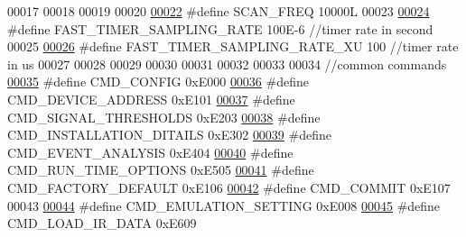 \begin{DoxyCode}
00017 
00018 
00019 
00020 
\hypertarget{a00031_source_l00022}{}\hyperlink{a00031_a8127170b687c1f67a968886c128e76e4}{00022} \textcolor{preprocessor}{#define SCAN\_FREQ                                       10000L}
00023 
\hypertarget{a00031_source_l00024}{}\hyperlink{a00031_a3a4dcb8af26a561d90607a41a3745806}{00024} \textcolor{preprocessor}{#define FAST\_TIMER\_SAMPLING\_RATE                        100E-6        //timer rate in second}
00025 
\hypertarget{a00031_source_l00026}{}\hyperlink{a00031_a87ea9a0eaa474d8b8f672cfa5cbb091f}{00026} \textcolor{preprocessor}{#define FAST\_TIMER\_SAMPLING\_RATE\_XU                     100           //timer rate in us}
00027 
00028 
00029 
00030 
00031 
00032 
00033 
00034 \textcolor{comment}{//common commands}
\hypertarget{a00031_source_l00035}{}\hyperlink{a00031_aa87bfa4fccf7f7a4fc45afb1966a655f}{00035} \textcolor{preprocessor}{#define CMD\_CONFIG                                              0xE000}
\hypertarget{a00031_source_l00036}{}\hyperlink{a00031_a7c6a5f4023cb02d02f2ded23147be425}{00036} \textcolor{preprocessor}{#define CMD\_DEVICE\_ADDRESS                                      0xE101}
\hypertarget{a00031_source_l00037}{}\hyperlink{a00031_ac361dc1b32c1036394be0fd7de1182ca}{00037} \textcolor{preprocessor}{#define CMD\_SIGNAL\_THRESHOLDS                                   0xE203}
\hypertarget{a00031_source_l00038}{}\hyperlink{a00031_af91ff280feea1f52e3bdd7f0f556d153}{00038} \textcolor{preprocessor}{#define CMD\_INSTALLATION\_DITAILS                                0xE302}
\hypertarget{a00031_source_l00039}{}\hyperlink{a00031_a3a15793e3ab7817f2429edf04de693a0}{00039} \textcolor{preprocessor}{#define CMD\_EVENT\_ANALYSIS                                      0xE404}
\hypertarget{a00031_source_l00040}{}\hyperlink{a00031_a1d8673a7ca545f3e382fc538f543ab72}{00040} \textcolor{preprocessor}{#define CMD\_RUN\_TIME\_OPTIONS                                    0xE505}
\hypertarget{a00031_source_l00041}{}\hyperlink{a00031_a8ad7dae51114833acbb665d703d8ffeb}{00041} \textcolor{preprocessor}{#define CMD\_FACTORY\_DEFAULT                                     0xE106}
\hypertarget{a00031_source_l00042}{}\hyperlink{a00031_a7df85bf97a6a032220d7a71c78be5206}{00042} \textcolor{preprocessor}{#define CMD\_COMMIT                                              0xE107}
00043 
\hypertarget{a00031_source_l00044}{}\hyperlink{a00031_a230386ac00f9c01793857101e1680324}{00044} \textcolor{preprocessor}{#define CMD\_EMULATION\_SETTING                                   0xE008}
\hypertarget{a00031_source_l00045}{}\hyperlink{a00031_a8c7ce698ee79d20e30eb0ac08f0d9abc}{00045} \textcolor{preprocessor}{#define CMD\_LOAD\_IR\_DATA                                        0xE609}

\end{DoxyCode}
